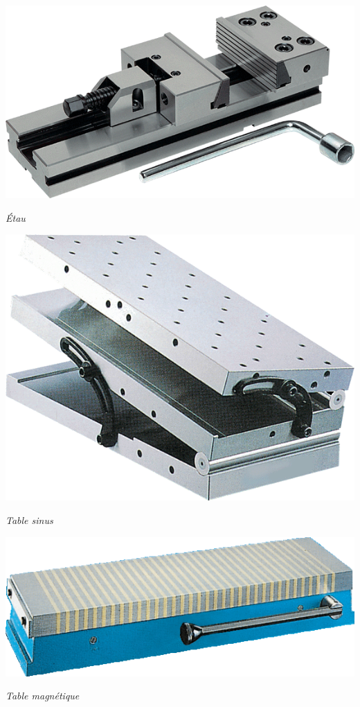 \documentclass[11pt,oneside]{article}
\begin{document}
\begin{minipage}[c]{.3\linewidth}
\begin{center}
\includegraphics[width=.95\textwidth]{png/etau}

\textit{Étau}
\end{center}
\end{minipage} \hfill
\begin{minipage}[c]{.3\linewidth}
\begin{center}
\includegraphics[width=.95\textwidth]{png/sinus}

\textit{Table sinus}
\end{center}
\end{minipage}\hfill
\begin{minipage}[c]{.3\linewidth}
\begin{center}
\includegraphics[width=.95\textwidth]{png/table_magnetique}

\textit{Table magnétique}
\end{center}
\end{minipage}
\end{document}
